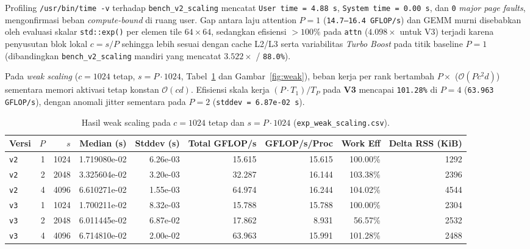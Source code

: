 \documentclass[11pt,a4paper]{article}
\begin{document}
Profiling \texttt{/usr/bin/time -v} terhadap \texttt{bench\_v2\_scaling} mencatat \texttt{User time = 4.88 s}, \texttt{System time = 0.00 s}, dan \texttt{0} \emph{major page faults}, mengonfirmasi beban \emph{compute-bound} di ruang user. Gap antara laju attention $P=1$ (\texttt{14.7--16.4 GFLOP/s}) dan GEMM murni disebabkan oleh evaluasi skalar \texttt{std::exp()} per elemen tile $64\times 64$, sedangkan efisiensi $>100\%$ pada \texttt{attn} ($4.098\times$ untuk V3) terjadi karena penyusutan blok lokal $c=s/P$ sehingga lebih sesuai dengan cache L2/L3 serta variabilitas \emph{Turbo Boost} pada titik baseline $P=1$ (dibandingkan \texttt{bench\_v2\_scaling} mandiri yang mencatat $3.522\times$ / \texttt{88.0\%}).

Pada \emph{weak scaling} ($c=1024$ tetap, $s=P\cdot 1024$, Tabel~\ref{tab:weak} dan Gambar~\ref{fig:weak}), beban kerja per rank bertambah $P\times$ ($\mathcal{O}(Pc^2d)$) sementara memori aktivasi tetap konstan $\mathcal{O}(cd)$. Efisiensi skala kerja $(P\cdot T_1)/T_P$ pada \textbf{V3} mencapai \texttt{101.28\%} di $P=4$ (\texttt{63.963 GFLOP/s}), dengan anomali jitter sementara pada $P=2$ (\texttt{stddev = 6.87e-02 s}).

\begin{table}[H]
\centering
\caption{Hasil weak scaling pada $c = 1024$ tetap dan $s = P \cdot 1024$ (\texttt{exp\_weak\_scaling.csv}).}
\label{tab:weak}
\begin{tabular}{lrrrrrrrr}
\toprule
\textbf{Versi} & \textbf{$P$} & \textbf{$s$} & \textbf{Median (s)} & \textbf{Stddev (s)} & \textbf{Total GFLOP/s} & \textbf{GFLOP/s/Proc} & \textbf{Work Eff} & \textbf{Delta RSS (KiB)} \\
\midrule
\texttt{v2} & 1 & 1024 & 1.719080e-02 & 6.26e-03 & 15.615 & 15.615 & 100.00\% & 1292 \\
\texttt{v2} & 2 & 2048 & 3.325604e-02 & 3.20e-03 & 32.287 & 16.144 & 103.38\% & 2396 \\
\texttt{v2} & 4 & 4096 & 6.610271e-02 & 1.55e-03 & 64.974 & 16.244 & 104.02\% & 4544 \\
\texttt{v3} & 1 & 1024 & 1.700211e-02 & 8.32e-03 & 15.788 & 15.788 & 100.00\% & 2304 \\
\texttt{v3} & 2 & 2048 & 6.011445e-02 & 6.87e-02 & 17.862 & 8.931 & 56.57\% & 2532 \\
\texttt{v3} & 4 & 4096 & 6.714810e-02 & 2.00e-02 & 63.963 & 15.991 & 101.28\% & 2488 \\
\bottomrule
\end{tabular}
\end{table}
\end{document}
